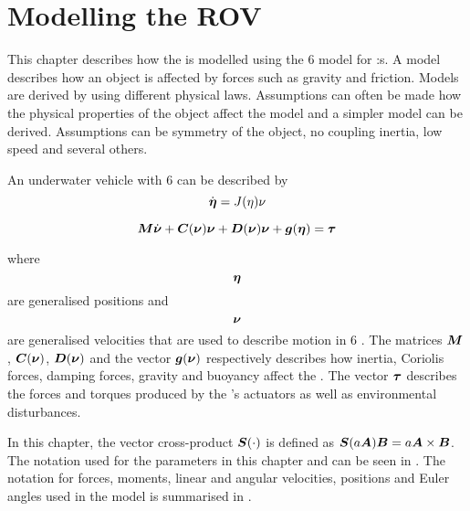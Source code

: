 \chapter{Modelling the ROV} \label{cha:modelling}
This chapter describes how the \abbrROV is modelled using the \citet{fossen2011} 6 \abbrDOF model for \abbrROV:s. A model describes how an object is affected by forces such as gravity and friction. Models are derived by using different physical laws. Assumptions can often be made how the physical properties of the object affect the model and a simpler model can be derived. Assumptions can be symmetry of the object, no coupling inertia, low speed and several others. 

An underwater vehicle with 6 \abbrDOF can be described by
\begin{equation}
\dot{\boldsymbol{\eta}} = J(\eta)\nu
\end{equation}

\begin{equation} \label{eq:model}
 \boldsymbol{M} \dot{\boldsymbol{\nu}} + \boldsymbol{C}(\boldsymbol{\nu})\boldsymbol{\nu} + \boldsymbol{D}(\boldsymbol{\nu})\boldsymbol{\nu} + \boldsymbol{g}(\boldsymbol{\eta}) = \boldsymbol{\tau}
\end{equation}
 
where
\begin{equation*}
  \boldsymbol{\eta}  
\end{equation*} are generalised positions and
\begin{equation*}
  \boldsymbol{\nu}
\end{equation*}
are generalised velocities that are used to describe motion in 6 \abbrDOF \citep[p. 15]{fossen2011}. The matrices $\boldsymbol{M}$, $\boldsymbol{C}(\boldsymbol{\nu})$, $\boldsymbol{D}(\boldsymbol{\nu})$ and the vector $\boldsymbol{g}(\boldsymbol{\nu})$ respectively describes how inertia, Coriolis forces, damping forces, gravity and buoyancy affect the \abbrROV. The vector $\boldsymbol{\tau}$ describes the forces and torques produced by the \abbrROV's actuators as well as environmental disturbances.
 
In this chapter, the vector cross-product $\boldsymbol{S}(\cdot)$ is defined as $\boldsymbol{S}(a\boldsymbol{A}) \boldsymbol{B} = a\boldsymbol{A} \times \boldsymbol{B}$. The notation used for the parameters in this chapter and  can be seen in . The notation for forces, moments, linear and angular velocities, positions and Euler angles used in the model is summarised in . 

